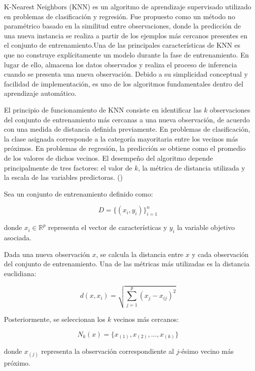K-Nearest Neighbors (KNN) es un algoritmo de aprendizaje supervisado utilizado en problemas de clasificación y regresión. Fue propuesto como un método no paramétrico basado en la similitud entre observaciones, donde la predicción de una nueva instancia se realiza a partir de los ejemplos más cercanos presentes en el conjunto de entrenamiento.Una de las principales características de KNN es que no construye explícitamente un modelo durante la fase de entrenamiento. En lugar de ello, almacena los datos observados y realiza el proceso de inferencia cuando se presenta una nueva observación. Debido a su simplicidad conceptual y facilidad de implementación, es uno de los algoritmos fundamentales dentro del aprendizaje automático.

El principio de funcionamiento de KNN consiste en identificar las $k$ observaciones del conjunto de entrenamiento más cercanas a una nueva observación, de acuerdo con una medida de distancia definida previamente.
En problemas de clasificación, la clase asignada corresponde a la categoría mayoritaria entre los vecinos más próximos. En problemas de regresión, la predicción se obtiene como el promedio de los valores de dichos vecinos.
El desempeño del algoritmo depende principalmente de tres factores: el valor de $k$, la métrica de distancia utilizada y la escala de las variables predictoras. (\cite{hastie2009elementsKNN})


Sea un conjunto de entrenamiento definido como:

\begin{equation}
	D = \{(x_i, y_i)\}_{i=1}^{n}
\end{equation}

donde $x_i \in \mathbb{R}^{p}$ representa el vector de características y $y_i$ la variable objetivo asociada.

Dada una nueva observación $x$, se calcula la distancia entre $x$ y cada observación del conjunto de entrenamiento. Una de las métricas más utilizadas es la distancia euclidiana:

\begin{equation}
	d(x, x_i) = \sqrt{\sum_{j=1}^{p}(x_j - x_{ij})^2}
\end{equation}

Posteriormente, se seleccionan los $k$ vecinos más cercanos:

\begin{equation}
	N_k(x) = \{x_{(1)}, x_{(2)}, \dots, x_{(k)}\}
\end{equation}

donde $x_{(j)}$ representa la observación correspondiente al $j$-ésimo vecino más próximo.

